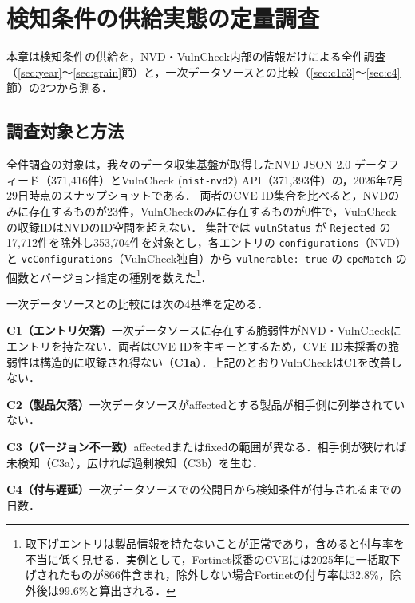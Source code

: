 \section{検知条件の供給実態の定量調査}
\label{sec:supply}

本章は検知条件の供給を，NVD・VulnCheck内部の情報だけによる全件調査（\ref{sec:year}〜\ref{sec:grain}節）と，一次データソースとの比較（\ref{sec:c1c3}〜\ref{sec:c4}節）の2つから測る．

\subsection{調査対象と方法}
\label{sec:method3}

全件調査の対象は，我々のデータ収集基盤が取得したNVD JSON 2.0 データフィード\cite{nvd-feed}（371,416件）とVulnCheck \nvdpp{} (\texttt{nist-nvd2}) API\cite{vulncheck-nvd2}（371,393件）の，2026年7月29日時点のスナップショットである．
両者のCVE ID集合を比べると，NVDのみに存在するものが23件，VulnCheckのみに存在するものが0件で，VulnCheck \nvdpp{} の収録IDはNVDのID空間を超えない．
集計では \texttt{vulnStatus} が \texttt{Rejected} の17,712件を除外し353,704件を対象とし，各エントリの \texttt{configurations}（NVD）と \texttt{vcConfigurations}（VulnCheck独自）から \texttt{vulnerable: true} の \texttt{cpeMatch} の個数とバージョン指定の種別を数えた\footnote{取下げエントリは製品情報を持たないことが正常であり，含めると付与率を不当に低く見せる．実例として，Fortinet採番のCVEには2025年に一括取下げされたものが866件含まれ，除外しない場合Fortinetの付与率は32.8\%，除外後は99.6\%と算出される．}．

一次データソースとの比較には次の4基準を定める．
\begin{list}{}{%
  \setlength{\leftmargin}{1zw}\setlength{\itemindent}{-1zw}%
  \setlength{\labelwidth}{0pt}\setlength{\labelsep}{0pt}%
  \setlength{\topsep}{2pt}\setlength{\itemsep}{0pt}%
  \setlength{\parsep}{0pt}\setlength{\partopsep}{0pt}}
\item \textbf{C1（エントリ欠落）}一次データソースに存在する脆弱性がNVD・VulnCheckにエントリを持たない．両者はCVE IDを主キーとするため，CVE ID未採番の脆弱性は構造的に収録され得ない（\textbf{C1a}）．上記のとおりVulnCheckはC1を改善しない．
\item \textbf{C2（製品欠落）}一次データソースがaffectedとする製品が相手側に列挙されていない．
\item \textbf{C3（バージョン不一致）}affectedまたはfixedの範囲が異なる．相手側が狭ければ未検知（C3a），広ければ過剰検知（C3b）を生む．
\item \textbf{C4（付与遅延）}一次データソースでの公開日から検知条件が付与されるまでの日数．
\end{list}

